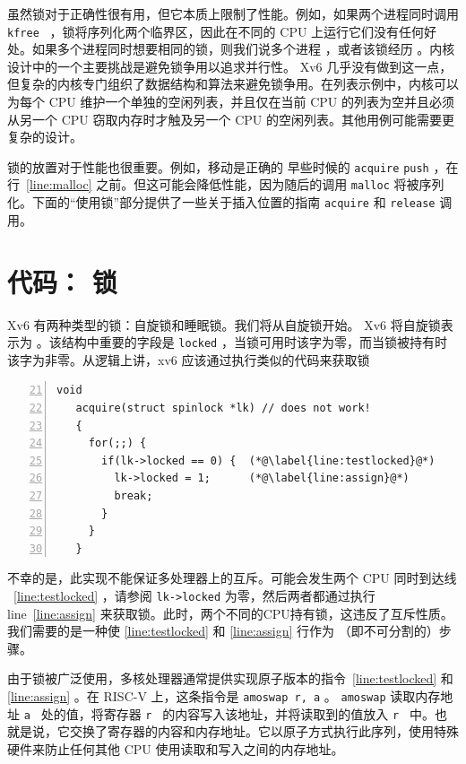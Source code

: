 虽然锁对于正确性很有用，但它本质上限制了性能。例如，如果两个进程同时调用  {    \tt    kfree   } ，锁将序列化两个临界区，因此在不同的 CPU 上运行它们没有任何好处。如果多个进程同时想要相同的锁，则我们说多个进程        ，或者该锁经历        。内核设计中的一个主要挑战是避免锁争用以追求并行性。 Xv6 几乎没有做到这一点，但复杂的内核专门组织了数据结构和算法来避免锁争用。在列表示例中，内核可以为每个 CPU 维护一个单独的空闲列表，并且仅在当前 CPU 的列表为空并且必须从另一个 CPU 窃取内存时才触及另一个 CPU 的空闲列表。其他用例可能需要更复杂的设计。  

锁的放置对于性能也很重要。例如，移动是正确的
 早些时候的    \lstinline{acquire}   
    \lstinline{push}    ，在行~\ref{line:malloc}    之前。但这可能会降低性能，因为随后的调用
    \lstinline{malloc}    将被序列化。下面的“使用锁”部分提供了一些关于插入位置的指南
    \lstinline{acquire}    和
    \lstinline{release}    调用。
    \section{代码： 锁  }    Xv6 有两种类型的锁：自旋锁和睡眠锁。我们将从自旋锁开始。 Xv6 将自旋锁表示为
        。该结构中重要的字段是
    \lstinline{locked}    ，当锁可用时该字为零，而当锁被持有时该字为非零。从逻辑上讲，xv6 应该通过执行类似的代码来获取锁
    \begin{lstlisting}[numbers=left,firstnumber=21]
   void
   acquire(struct spinlock *lk) // does not work!
   {
     for(;;) {
       if(lk->locked == 0) {  (*@\label{line:testlocked}@*)
         lk->locked = 1;      (*@\label{line:assign}@*)
         break;
       }
     }
   }
\end{lstlisting}    不幸的是，此实现不能保证多处理器上的互斥。可能会发生两个 CPU 同时到达线 ~\ref{line:testlocked}    ，请参阅
    \lstinline{lk->locked}    为零，然后两者都通过执行 line~\ref{line:assign}    来获取锁。此时，两个不同的CPU持有锁，这违反了互斥性质。我们需要的是一种使    \ref{line:testlocked}    和    \ref{line:assign}    行作为
       （即不可分割的）步骤。  

由于锁被广泛使用，多核处理器通常提供实现原子版本的指令~\ref{line:testlocked}    和    \ref{line:assign}    。在 RISC-V 上，这条指令是
    \lstinline{amoswap r, a}    。
    \lstinline{amoswap}    读取内存地址  {    \tt    a   }  处的值，将寄存器  {    \tt    r   }  的内容写入该地址，并将读取到的值放入  {    \tt    r   }  中。也就是说，它交换了寄存器的内容和内存地址。它以原子方式执行此序列，使用特殊硬件来防止任何其他 CPU 使用读取和写入之间的内存地址。  

